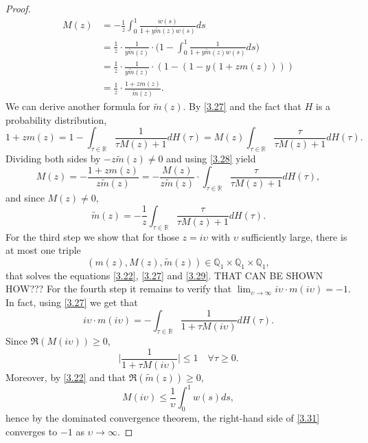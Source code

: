 \documentclass[a4paper,11pt]{book}
\theoremstyle{plain}
\theoremstyle{definition}
\newcommand{\MR}{\mathbb{R}}
\begin{document}
\begin{proof}
    	\begin{equation} \label{3.28}
    	\begin{aligned}
    	M(z) & = -\frac{1}{z} \int_{0}^{1} \frac{w(s)}{1+y\widetilde{m}(z) w(s)}ds \\
    	& = \frac{1}{z} \cdot \frac{1}{y\widetilde{m}(z)} \cdot \Big( 1 -  \int_{0}^{1} \frac{1}{1+y\widetilde{m}(z) w(s)}ds\Big)  \\
    	& = \frac{1}{z} \cdot \frac{1}{y\widetilde{m}(z)} \cdot ( 1 - (1 - y (1 + z m(z)) ) ) \\
    	& = \frac{1}{z} \cdot \frac{1 + zm(z)}{\widetilde{m}(z)}.
    	\end{aligned}
    	\end{equation}
    	We can derive another formula for $\widetilde{m}(z)$. By \eqref{3.27} and the fact that $H$ is a probability distribution,
    	\[ 1 + zm(z) = 1 - \int_{\tau \in \MR} \frac{1}{\tau M(z) + 1} dH(\tau) = M(z) \int_{\tau \in \MR} \frac{\tau}{\tau M(z) + 1} dH(\tau).  \]
    	Dividing both sides by $-z \widetilde{m}(z) \neq 0$ and using \eqref{3.28} yield
    	\[ M(z) = -\frac{1+zm(z)}{z\widetilde{m}(z)} = -\frac{M(z)}{z\widetilde{m}(z)} \cdot \int_{\tau \in \MR} \frac{\tau}{\tau M(z) + 1} dH(\tau),  \]
    	and since $M(z) \neq 0$,
    	\begin{equation} \label{3.29}
    		\widetilde{m}(z) = -\frac{1}{z} \int_{\tau \in \MR} \frac{\tau}{\tau M(z) + 1} dH(\tau).
    	\end{equation}
    	For the third step we show that for those $z = i \upsilon$ with $\upsilon$ sufficiently large, there is at most one triple
    	\[ (m(z), M(z), \widetilde{m}(z)) \in \mathbb{Q}_1 \times \mathbb{Q}_1 \times \mathbb{Q}_1, \]
    	that solves the equations \eqref{3.22}, \eqref{3.27} and \eqref{3.29}. THAT CAN BE SHOWN HOW???
    	For the fourth step it remains to verify that $\lim_{\upsilon \rightarrow \infty} i \upsilon \cdot m(i \upsilon) = -1$. In fact, using \eqref{3.27} we get that
    	\begin{equation} \label{3.31}
    		i \upsilon \cdot m(i \upsilon)  = -\int_{\tau \in \MR} \frac{1}{ 1+\tau M(i \upsilon) }dH(\tau).
    	\end{equation}
    	Since $\Re(M(i \upsilon)) \geq 0$, 
    	\[ \Big| \frac{1}{1+\tau M(i\upsilon)}\Big|  \leq 1 \quad \forall \tau \geq 0. \]
    	Moreover, by \eqref{3.22} and that $\Re(\widetilde{m}(z)) \geq 0$,
    	\[ M(i \upsilon) \leq \frac{1}{\upsilon} \int_{0}^{1} w(s)ds, \]
    	hence by the dominated convergence theorem, the right-hand side of \eqref{3.31} converges to $-1$ as $\upsilon \rightarrow \infty$.
    \end{proof}
    
\end{document}
